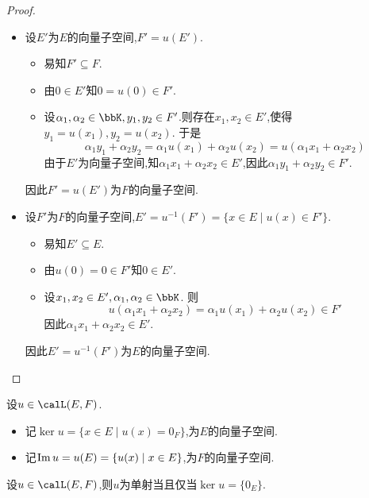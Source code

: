 \begin{proof} $\ $
    \begin{itemize}
        \item 设$E'$为$E$的向量子空间,$F' = u(E')$.
            \begin{itemize}
                \item 易知$F' \subseteq F$.
                \item 由$0 \in E'$知$0 = u(0) \in F'$.
                \item 设$\alpha_1, \alpha_2 \in \bbK, y_1, y_2 \in F'$.则存在$x_1, x_2 \in E'$,使得$y_1 = u(x_1), y_2 = u(x_2)$.
                    于是\[ \alpha_1 y_1 + \alpha_2 y_2 = \alpha_1 u(x_1) + \alpha_2 u(x_2) = u(\alpha_1 x_1 + \alpha_2 x_2) \]
                    由于$E'$为向量子空间,知$\alpha_1 x_1 + \alpha_2 x_2 \in E'$,因此$\alpha_1 y_1 + \alpha_2 y_2 \in F'$.
            \end{itemize}
            因此$F' = u(E')$为$F$的向量子空间.
        \item 设$F'$为$F$的向量子空间,$E' = u^{-1}(F') = \{ x \in E \mid u(x) \in F' \}$.
            \begin{itemize}
                \item 易知$E' \subseteq E$.
                \item 由$u(0) = 0 \in F'$知$0 \in E'$.
                \item 设$x_1, x_2 \in E', \alpha_1, \alpha_2 \in \bbK$.
                    则\[ u(\alpha_1 x_1 + \alpha_2 x_2) = \alpha_1 u(x_1) + \alpha_2 u(x_2) \in F' \]
                    因此$\alpha_1 x_1 + \alpha_2 x_2 \in E'$.
            \end{itemize}
            因此$E' = u^{-1}(F')$为$E$的向量子空间.
    \end{itemize}
\end{proof}

\begin{deff}
    设$u \in \calL(E, F)$.
    \begin{itemize}
        \item 记$\ker u = \{ x \in E \mid u(x) = 0_F \}$,为$E$的向量子空间.
        \item 记$\operatorname{Im} u = u(E) = \{ u(x) \mid x \in E \}$,为$F$的向量子空间.
    \end{itemize}
\end{deff}

\begin{thm}
    设$u \in \calL(E, F)$,则$u$为单射当且仅当$\ker u = \{ 0_E \}$.
\end{thm}


